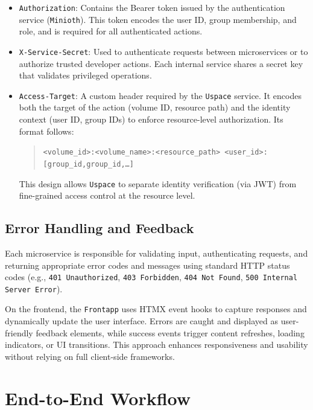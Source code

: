 \begin{itemize}
    \item \texttt{Authorization}: Contains the Bearer token issued by the authentication service (\texttt{Minioth}). This token encodes the user ID, group membership, and role, and is required for all authenticated actions.
    
    \item \texttt{X-Service-Secret}: Used to authenticate requests between microservices or to authorize trusted developer actions. Each internal service shares a secret key that validates privileged operations.
    
    \item \texttt{Access-Target}: A custom header required by the \texttt{Uspace} service. It encodes both the target of the action (volume ID, resource path) and the identity context (user ID, group IDs) to enforce resource-level authorization. Its format follows:
    
    \begin{quote}
    \texttt{<volume\_id>:<volume\_name>:<resource\_path> <user\_id>:[group\_id,group\_id,\ldots]}
    \end{quote}
    
    This design allows \texttt{Uspace} to separate identity verification (via JWT) from fine-grained access control at the resource level.
\end{itemize}

\subsection{Error Handling and Feedback}

Each microservice is responsible for validating input, authenticating requests, and returning appropriate 
error codes and messages using standard HTTP status codes (e.g., \texttt{401 Unauthorized}, 
\texttt{403 Forbidden}, \texttt{404 Not Found}, \texttt{500 Internal Server Error}).

On the frontend, the \texttt{Frontapp} uses HTMX event hooks to capture responses and dynamically update the user interface. Errors are caught and displayed as user-friendly feedback elements, while success events trigger content refreshes, loading indicators, or UI transitions. This approach enhances responsiveness and usability without relying on full client-side frameworks.



\section{End-to-End Workflow}
